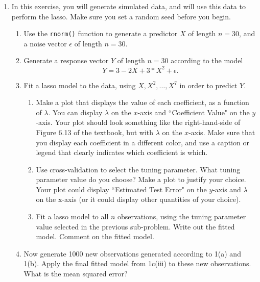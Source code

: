 \documentclass[12pt]{article}
\begin{document}
\begin{enumerate}



\item In this exercise, you will generate simulated data, and will use this data to perform the lasso. Make sure you set a random seed before you begin. %
\begin{enumerate}
\item Use the \verb=rnorm()= function to generate a predictor $X$ of length $n=30$, and a noise vector $\epsilon$ of length $n=30$.
\item Generate a response vector $Y$ of length $n=30$ according to the model
$$Y = 3 - 2X + 3*X^2  + \epsilon.$$
\item Fit a lasso model to the data, using  $X,X^2,\ldots,X^{7}$ in order to predict $Y$. 
\begin{enumerate}
\item Make a plot that displays the value of each coefficient, as a function of $\lambda$. You can display  $\lambda$ on the $x$-axis and ``Coefficient Value" on the $y$-axis. Your plot should look something like the right-hand-side of Figure 6.13 of the textbook, but with $\lambda$ on the $x$-axis. Make sure that you display each coefficient in a different color, and use a caption or legend that clearly indicates which coefficient is which. 
\item  Use cross-validation to select the tuning parameter. What tuning parameter value do you choose? Make a plot  to justify your choice. Your plot could display ``Estimated Test Error" on the $y$-axis and $\lambda$ on the x-axis (or it could display other quantities of your choice). 
\item Fit a lasso model to all $n$ observations, using the tuning parameter value selected in the previous sub-problem. Write out the fitted model. Comment on the fitted model.
\end{enumerate}
\item Now generate 1000 new observations generated according to 1(a) and 1(b). Apply the final fitted model from 1c(iii) to these new observations. What is the mean squared error?
\end{enumerate}



\end{enumerate}
\end{document}
